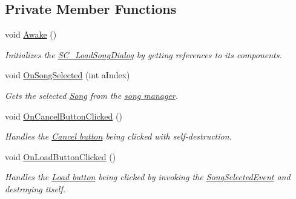 \subsection*{Private Member Functions}
\begin{DoxyCompactItemize}
\item 
void \hyperlink{group___s_c___l_s_d_unity_ga2fe8760877d7edd380795cac5749be50}{Awake} ()
\begin{DoxyCompactList}\small\item\em Initializes the \hyperlink{class_s_c___load_song_dialog}{S\+C\+\_\+\+Load\+Song\+Dialog} by getting references to its components. \end{DoxyCompactList}\item 
void \hyperlink{group___s_c___l_s_d_handlers_gacbe31698637339188fd50ba1a6723eab}{On\+Song\+Selected} (int a\+Index)
\begin{DoxyCompactList}\small\item\em Gets the selected \hyperlink{class_song}{Song} from the \hyperlink{class_song_manager_class}{song manager}. \end{DoxyCompactList}\item 
void \hyperlink{group___s_c___l_s_d_handlers_gae393a24bbdd4fa1d2b45fa4199fb453a}{On\+Cancel\+Button\+Clicked} ()
\begin{DoxyCompactList}\small\item\em Handles the \hyperlink{group___s_c___l_s_d_priv_var_ga31e17d7ca1cb32f0ad75ef8c7235873f}{Cancel button} being clicked with self-\/destruction. \end{DoxyCompactList}\item 
void \hyperlink{group___s_c___l_s_d_handlers_gad6ab852f2ac019395482e8c836061639}{On\+Load\+Button\+Clicked} ()
\begin{DoxyCompactList}\small\item\em Handles the \hyperlink{group___s_c___l_s_d_priv_var_gaa27cfb6231ef826024dd063828efa364}{Load button} being clicked by invoking the \hyperlink{group___s_c___l_s_d_event_types_class_s_c___load_song_dialog_1_1_song_selected_event}{Song\+Selected\+Event} and destroying itself. \end{DoxyCompactList}\end{DoxyCompactItemize}
